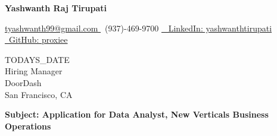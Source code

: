 \documentclass[letterpaper,11pt]{article}
\begin{document}
\begin{center}
    \textbf{\LARGE Yashwanth Raj Tirupati}
    \vspace{4pt}
    
    \small
    \href{mailto:tyashwanth99@gmail.com}{ tyashwanth99@gmail.com }\textbar
     ~(937)-469-9700 \textbar
    \href{https://linkedin.com/in/yashwanthtirupati}{~ LinkedIn: yashwanthtirupati }\textbar 
    \href{https://github.com/proxiee}{~GitHub: proxiee }
\end{center}

\vspace{20pt}

\begin{flushleft}
    {{TODAYS_DATE}} \\
    \vspace{12pt}
    Hiring Manager \\
    DoorDash \\
    San Francisco, CA \\
\end{flushleft}


\begin{flushleft}
\textbf{Subject: Application for Data Analyst, New Verticals Business Operations}
\end{flushleft}


\end{document}

